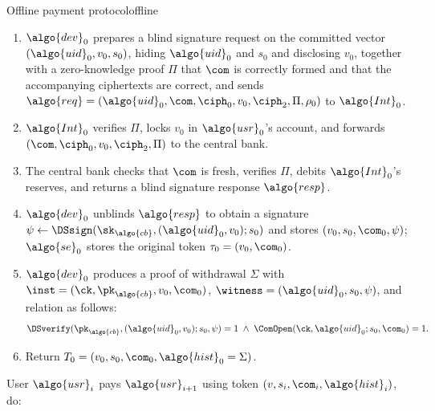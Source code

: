 \begin{protocolbox}{Offline payment protocol}{offline}
\begin{description}
\begin{enumerate}
        \item $\algo{dev}_0$ prepares a blind signature request on the
          committed vector $(\algo{uid}_0, v_0, s_0)$, hiding $\algo{uid}_0$
          and $s_0$ and disclosing $v_0$, together with a zero-knowledge proof
          $\Pi$ that $\com$ is correctly formed and that the accompanying
          ciphertexts are correct, and sends $\algo{req} = (\algo{uid}_0, \com,
          \ciph_0, v_0, \ciph_2, \Pi, \rho_0)$ to $\algo{Int}_0$.

        \item $\algo{Int}_0$ verifies $\Pi$, locks $v_0$ in $\algo{usr}_0$'s
          account, and forwards $(\com, \ciph_0, v_0, \ciph_2, \Pi)$ to the
          central bank.

        \item The central bank checks that $\com$ is fresh, verifies $\Pi$,
          debits $\algo{Int}_0$'s reserves, and returns a blind signature
          response $\algo{resp}$.

        \item $\algo{dev}_0$ unblinds $\algo{resp}$ to obtain a signature $\psi
          \leftarrow \DSsign(\sk_{\algo{cb}}, (\algo{uid}_0, v_0); s_0)$ and
          stores $(v_0, s_0, \com_0, \psi)$; $\algo{se}_0$ stores the original
          token $\tau_0 = (v_0, \com_0)$.

        \item $\algo{dev}_0$ produces a proof of withdrawal $\Sigma$ with
          $\inst = (\ck, \pk_{\algo{cb}}, v_0, \com_0)$, $\witness =
          (\algo{uid}_0, s_0, \psi)$, and relation as follows:
          \begin{equation*} \DSverify(\pk_{\algo{cb}}, (\algo{uid}_0, v_0);
            s_0, \psi) = 1 \;\wedge\; \ComOpen(\ck, \algo{uid}_0; s_0, \com_0)
          = 1.  \end{equation*}

        \item Return $T_0 = (v_0, s_0, \com_0, \algo{hist}_0 = \Sigma)$.

      \end{enumerate}

    \item[$p_i \leftarrow \algo{Pay}(v, s_i, \com_i, \algo{hist}_i)$
      :]\label{sec:payments} User $\algo{usr}_i$ pays $\algo{usr}_{i+1}$ using
      token $(v, s_i, \com_i, \algo{hist}_i)$, do:

      \begin{enumerate}


\end{enumerate}
\end{description}
\end{protocolbox}
